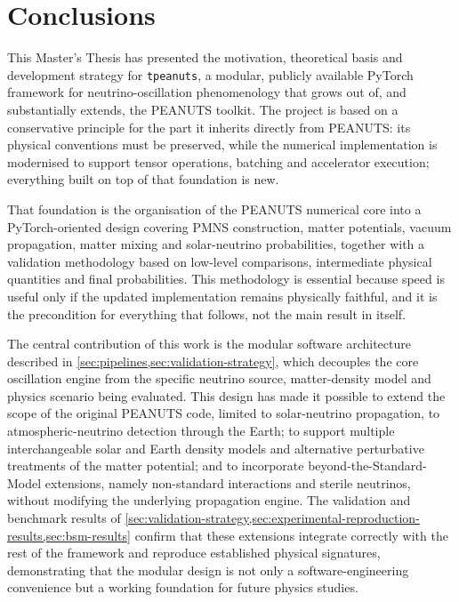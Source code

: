 \section{Conclusions}

This Master's Thesis has presented the motivation, theoretical basis and development strategy for \texttt{tpeanuts}, a modular, publicly available PyTorch framework for neutrino-oscillation phenomenology that grows out of, and substantially extends, the PEANUTS toolkit. The project is based on a conservative principle for the part it inherits directly from PEANUTS: its physical conventions must be preserved, while the numerical implementation is modernised to support tensor operations, batching and accelerator execution; everything built on top of that foundation is new.

That foundation is the organisation of the PEANUTS numerical core into a PyTorch-oriented design covering PMNS construction, matter potentials, vacuum propagation, matter mixing and solar-neutrino probabilities, together with a validation methodology based on low-level comparisons, intermediate physical quantities and final probabilities. This methodology is essential because speed is useful only if the updated implementation remains physically faithful, and it is the precondition for everything that follows, not the main result in itself.

The central contribution of this work is the modular software architecture described in \cref{sec:pipelines,sec:validation-strategy}, which decouples the core oscillation engine from the specific neutrino source, matter-density model and physics scenario being evaluated. This design has made it possible to extend the scope of the original PEANUTS code, limited to solar-neutrino propagation, to atmospheric-neutrino detection through the Earth; to support multiple interchangeable solar and Earth density models and alternative perturbative treatments of the matter potential; and to incorporate beyond-the-Standard-Model extensions, namely non-standard interactions and sterile neutrinos, without modifying the underlying propagation engine. The validation and benchmark results of \cref{sec:validation-strategy,sec:experimental-reproduction-results,sec:bsm-results} confirm that these extensions integrate correctly with the rest of the framework and reproduce established physical signatures, demonstrating that the modular design is not only a software-engineering convenience but a working foundation for future physics studies.

